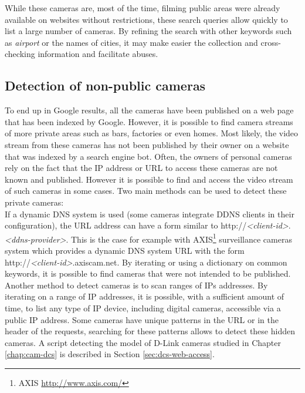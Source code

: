 While these cameras are, most of the time, filming public areas were already available on websites without restrictions, these search queries allow quickly to list a large number of cameras.
By refining the search with other keywords such as \emph{airport} or the names of cities, it may make easier the collection and cross-checking information and facilitate abuses.\\

\subsection{Detection of non-public cameras}
\label{sec:cam-detection-hidden}

To end up in Google results, all the cameras have been published on a web page that has been indexed by Google.
However, it is possible to find camera streams of more private areas such as bars, factories or even homes.
Most likely, the video stream from these cameras has not been published by their owner on a website that was indexed by a search engine bot.
Often, the owners of personal cameras rely on the fact that the IP address or URL to access these cameras are not known and published.
However it is possible to find and access the video stream of such cameras in some cases.
Two main methods can be used to detect these private cameras:\\

If a dynamic DNS system is used (some cameras integrate DDNS clients in their configuration), the URL address can have a form similar to http://\emph{\textless client-id\textgreater}.\emph{\textless ddns-provider\textgreater}.
This is the case for example with AXIS\footnote{AXIS \url{http://www.axis.com/}} surveillance cameras system which provides a dynamic DNS system URL with the form http://\emph{\textless client-id\textgreater}.axiscam.net.
By iterating or using a dictionary on common keywords, it is possible to find cameras that were not intended to be published.\\

Another method to detect cameras is to scan ranges of IPs addresses.
By iterating on a range of IP addresses, it is possible, with a sufficient amount of time, to list any type of IP device, including digital cameras, accessible via a public IP address.
Some cameras have unique patterns in the URL or in the header of the requests, searching for these patterns allows to detect these hidden cameras.
A script detecting the model of D-Link cameras studied in Chapter \ref{chap:cam-dcs} is described in Section \ref{sec:dcs-web-access}.\\


